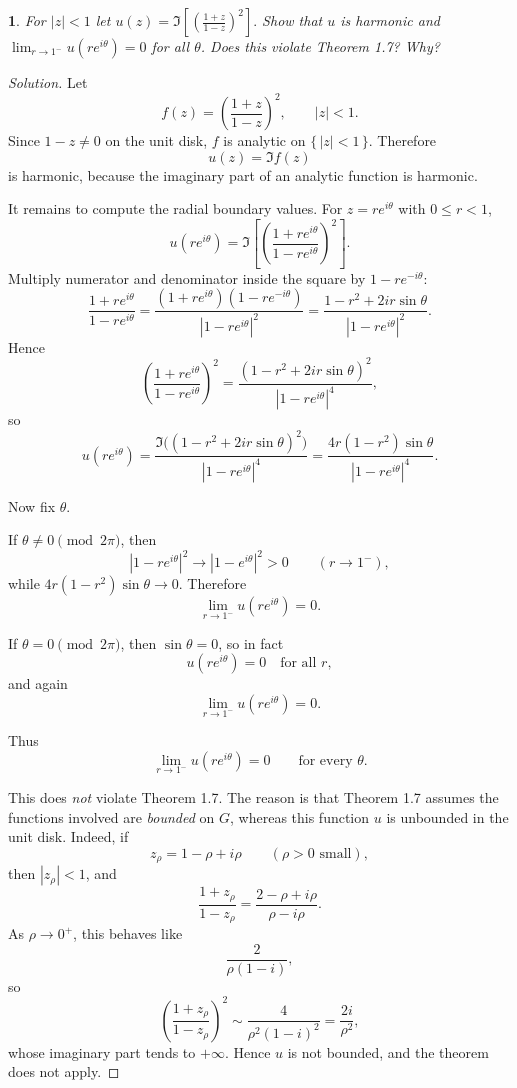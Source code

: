 \documentclass[12pt, a4paper]{report}
\theoremstyle{spaced}
\newtheorem{exercise}{}
\newcommand{\setexercise}[1]{\setcounter{exercise}{#1-1}}
\begin{document}
\setexercise{7}
\begin{exercise}
	For $|z|<1$ let
	\(
	u(z)=\Im\left[\left(\frac{1+z}{1-z}\right)^2\right].
	\)
	Show that $u$ is harmonic and
	\(
	\lim_{r\to 1^-} u(re^{i\theta})=0
	\)
	for all $\theta$. Does this violate Theorem 1.7? Why?
\end{exercise}
\begin{proof}[Solution]
	Let
	\[
		f(z)=\left(\frac{1+z}{1-z}\right)^2, \qquad |z|<1.
	\]
	Since \(1-z\neq 0\) on the unit disk, \(f\) is analytic on \(\{\,|z|<1\,\}\). Therefore
	\[
		u(z)=\Im f(z)
	\]
	is harmonic, because the imaginary part of an analytic function is harmonic.

	It remains to compute the radial boundary values. For \(z=re^{i\theta}\) with \(0\le r<1\),
	\[
		u(re^{i\theta})
		=\Im\left[\left(\frac{1+re^{i\theta}}{1-re^{i\theta}}\right)^2\right].
	\]
	Multiply numerator and denominator inside the square by \(1-re^{-i\theta}\):
	\[
		\frac{1+re^{i\theta}}{1-re^{i\theta}}
		=
		\frac{(1+re^{i\theta})(1-re^{-i\theta})}{|1-re^{i\theta}|^2}
		=
		\frac{1-r^2+2ir\sin\theta}{|1-re^{i\theta}|^2}.
	\]
	Hence
	\[
		\left(\frac{1+re^{i\theta}}{1-re^{i\theta}}\right)^2
		=
		\frac{(1-r^2+2ir\sin\theta)^2}{|1-re^{i\theta}|^4},
	\]
	so
	\[
		u(re^{i\theta})
		=
		\frac{\Im\bigl((1-r^2+2ir\sin\theta)^2\bigr)}{|1-re^{i\theta}|^4}
		=
		\frac{4r(1-r^2)\sin\theta}{|1-re^{i\theta}|^4}.
	\]

	Now fix \(\theta\).

	If \(\theta\neq 0 \pmod{2\pi}\), then
	\[
		|1-re^{i\theta}|^2 \to |1-e^{i\theta}|^2>0
		\qquad (r\to 1^-),
	\]
	while \(4r(1-r^2)\sin\theta\to 0\). Therefore
	\[
		\lim_{r\to 1^-}u(re^{i\theta})=0.
	\]

	If \(\theta=0 \pmod{2\pi}\), then \(\sin\theta=0\), so in fact
	\[
		u(re^{i\theta})=0
		\quad\text{for all } r,
	\]
	and again
	\[
		\lim_{r\to 1^-}u(re^{i\theta})=0.
	\]

	Thus
	\[
		\lim_{r\to 1^-}u(re^{i\theta})=0
		\qquad\text{for every }\theta.
	\]

	This does \emph{not} violate Theorem 1.7. The reason is that Theorem 1.7 assumes the functions involved are \emph{bounded} on \(G\), whereas this function \(u\) is unbounded in the unit disk. Indeed, if
	\[
		z_\rho = 1-\rho+i\rho \qquad (\rho>0 \text{ small}),
	\]
	then \(|z_\rho|<1\), and
	\[
		\frac{1+z_\rho}{1-z_\rho}
		=
		\frac{2-\rho+i\rho}{\rho-i\rho}.
	\]
	As \(\rho\to 0^+\), this behaves like
	\[
		\frac{2}{\rho(1-i)},
	\]
	so
	\[
		\left(\frac{1+z_\rho}{1-z_\rho}\right)^2
		\sim \frac{4}{\rho^2(1-i)^2}
		= \frac{2i}{\rho^2},
	\]
	whose imaginary part tends to \(+\infty\). Hence \(u\) is not bounded, and the theorem does not apply.
\end{proof}
\end{document}
